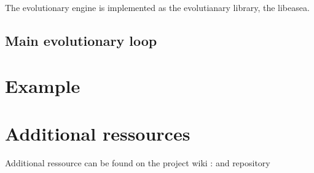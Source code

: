 \documentclass{book}
\begin{document}
  The evolutionary engine is implemented as the evolutianary library, the libeasea.

  \label{sub:EASEA library}
   \subsection{Main evolutionary loop} %
   \label{sub:subsection name}
   

\section{Example} %
\label{sec:example}


\section{Additional ressources} %
\label{sec:Additional}
Additional ressource can be found on the project wiki : and repository 
\end{document}
